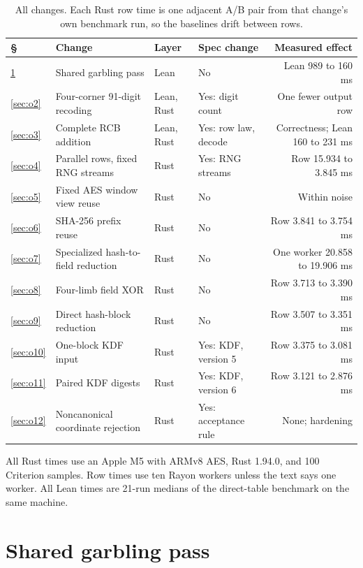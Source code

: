 \documentclass[10pt]{article}
\begin{document}
\begin{table}[h]
\centering
\footnotesize
\begin{tabular}{llllr}
\toprule
\S & Change & Layer & Spec change & Measured effect \\
\midrule
\ref{sec:o1} & Shared garbling pass & Lean & No & Lean 989 to 160 ms \\
\ref{sec:o2} & Four-corner 91-digit recoding & Lean, Rust & Yes: digit count & One fewer output row \\
\ref{sec:o3} & Complete RCB addition & Lean, Rust & Yes: row law, decode & Correctness; Lean 160 to 231 ms \\
\ref{sec:o4} & Parallel rows, fixed RNG streams & Rust & Yes: RNG streams & Row 15.934 to 3.845 ms \\
\ref{sec:o5} & Fixed AES window view reuse & Rust & No & Within noise \\
\ref{sec:o6} & SHA-256 prefix reuse & Rust & No & Row 3.841 to 3.754 ms \\
\ref{sec:o7} & Specialized hash-to-field reduction & Rust & No & One worker 20.858 to 19.906 ms \\
\ref{sec:o8} & Four-limb field XOR & Rust & No & Row 3.713 to 3.390 ms \\
\ref{sec:o9} & Direct hash-block reduction & Rust & No & Row 3.507 to 3.351 ms \\
\ref{sec:o10} & One-block KDF input & Rust & Yes: KDF, version 5 & Row 3.375 to 3.081 ms \\
\ref{sec:o11} & Paired KDF digests & Rust & Yes: KDF, version 6 & Row 3.121 to 2.876 ms \\
\ref{sec:o12} & Noncanonical coordinate rejection & Rust & Yes: acceptance rule & None; hardening \\
\bottomrule
\end{tabular}
\caption{All changes. Each Rust row time is one adjacent A/B pair from that change's own benchmark run, so the baselines drift between rows.}
\label{tab:summary}
\end{table}

All Rust times use an Apple M5 with ARMv8 AES, Rust 1.94.0, and 100 Criterion samples.
Row times use ten Rayon workers unless the text says one worker.
All Lean times are 21-run medians of the direct-table benchmark on the same machine.

\section{Shared garbling pass}
\label{sec:o1}
\end{document}
